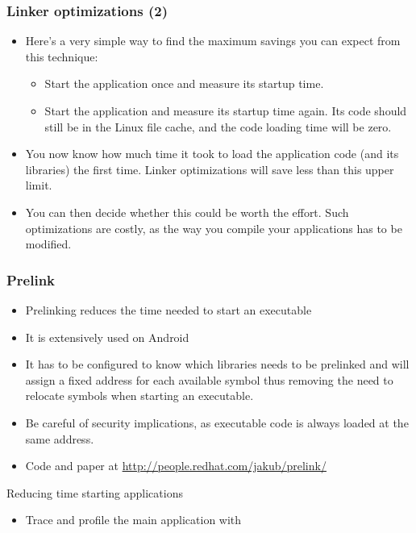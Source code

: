 \begin{frame}
\frametitle{Linker optimizations (2)}
\begin{itemize}
\item Here's a very simple way to find the maximum savings you can expect
      from this technique:
      \begin{itemize}
      \item Start the application once and measure its startup time. 
      \item Start the application and measure its startup time again.
            Its code should still be in the Linux file cache,
            and the code loading time will be zero.
      \end{itemize}
\item You now know how much time it took to load the application code
      (and its libraries) the first time. Linker optimizations will
      save less than this upper limit.
\item You can then decide whether this could be worth the effort.
      Such optimizations are costly, as the way you compile your
      applications has to be modified.
\end{itemize}
\end{frame}


\begin{frame}
\frametitle{Prelink}
\begin{itemize}
\item Prelinking reduces the time needed to start an executable
\item It is extensively used on Android
\item It has to be configured to know which libraries needs to be
      prelinked and will assign a fixed address for each available
      symbol thus removing the need to relocate symbols when starting
      an executable.
\item Be careful of security implications, as executable code is
      always loaded at the same address.
\item Code and paper at
      \url{http://people.redhat.com/jakub/prelink/}
\end{itemize}
\end{frame}

\setuplabframe
{Reducing time starting applications}
{
\begin{itemize}
\item Trace and profile the main application with 
\end{itemize}
}

